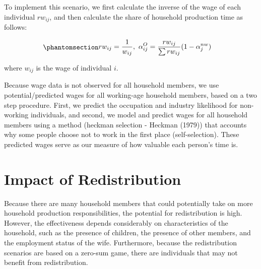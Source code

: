 \documentclass[
  11pt,
]{article}
\begin{document}
To implement this scenario, we first calculate the inverse of the wage
of each individual \(rw_{ij}\), and then calculate the share of
household production time as follows:

\begin{equation}\phantomsection\label{eq-r3}{\begin{aligned}
rw_{ij} &= \frac{1}{w_{ij}}, \ \alpha_{ij}^O  = \frac{rw_{ij}}{\sum rw_{ij}} (1-\alpha_{j}^{nw})
\end{aligned}
}\end{equation}

where \(w_{ij}\) is the wage of individual \(i\).

Because wage data is not observed for all household members, we use
potential/predicted wages for all working-age household members, based
on a two step procedure. First, we predict the occupation and industry
likelihood for non-working individuals, and second, we model and predict
wages for all household members using a method (heckman selection -
Heckman (1979)) that accounts why some people choose not to work in the
first place (self-selection). These predicted wages serve as our measure
of how valuable each person's time is.

\section{Impact of Redistribution}\label{impact-of-redistribution}

Because there are many household members that could potentially take on
more household production responsibilities, the potential for
redistribution is high. However, the effectiveness depends considerably
on characteristics of the household, such as the presence of children,
the presence of other members, and the employment status of the wife.
Furthermore, because the redistribution scenarios are based on a
zero-sum game, there are individuals that may not benefit from
redistribution.
\end{document}
